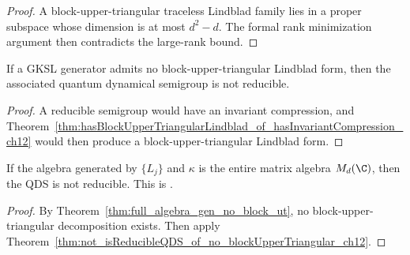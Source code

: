 \begin{proof}
    \leanok
    A block-upper-triangular traceless Lindblad family lies in a proper subspace whose dimension is
    at most $d^2-d$. The formal rank minimization argument then contradicts the large-rank bound.
\end{proof}

\begin{theorem}
    \label{thm:not_isReducibleQDS_of_no_blockUpperTriangular_ch12}
    \leanok
    If a GKSL generator admits no block-upper-triangular Lindblad form, then the associated
    quantum dynamical semigroup is not reducible.
\end{theorem}

\begin{proof}
    \leanok
    A reducible semigroup would have an invariant compression, and
    Theorem~\ref{thm:hasBlockUpperTriangularLindblad_of_hasInvariantCompression_ch12}
    would then produce a block-upper-triangular Lindblad form.
\end{proof}

\begin{theorem}
    \label{thm:not_isReducible_of_generates_full_algebra}
    \leanok
    If the algebra generated by $\{L_j\}$ and $\kappa$ is the entire
    matrix algebra $M_d(\C)$, then the QDS is not reducible.
    This is \cite[Corollary~7.2(1)]{Wolf2012Quantum}.
\end{theorem}
\begin{proof}\leanok
    By Theorem~\ref{thm:full_algebra_gen_no_block_ut}, no block-upper-triangular
    decomposition exists. Then apply
    Theorem~\ref{thm:not_isReducibleQDS_of_no_blockUpperTriangular_ch12}.
\end{proof}

